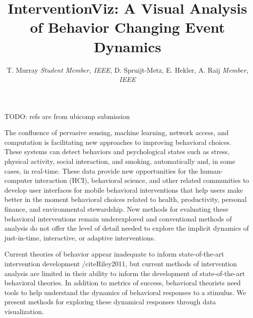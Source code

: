 \documentclass[review,journal]{vgtc}         %
\title{InterventionViz: A Visual Analysis of Behavior Changing Event Dynamics}
\author{T. Murray \textit{Student Member, IEEE}, D. Spruijt-Metz, E. Hekler, A. Raij \textit{Member, IEEE}}
\begin{document}


\maketitle


TODO: refs are from ubicomp submission

The confluence of pervasive sensing, machine learning, network access, and computation is facilitating new approaches to improving behavioral choices.
These systems can detect behaviors and psychological states such as stress\cite{chang2011,lu2012}, physical activity\cite{li2010,emken2012}, social interaction\cite{wyatt2011}, and smoking\cite{sazonov2011}, automatically and, in some cases, in real-time.
These data provide new opportunities for the human-computer interaction (HCI), behavioral science, and other related communities to develop user interfaces for mobile behavioral interventions that help users make better in the moment behavioral choices related to health\cite{klasnja2012,nahum2012}, productivity\cite{ho2005,sohn2005,jewell2011}, personal finance\cite{gallego2012}, and environmental stewardship.\cite{elliott2012}
New methods for evaluating these behavioral interventions remain underexplored and conventional methods of analysis do not offer the level of detail needed to explore the implicit dynamics of just-in-time, interactive, or adaptive interventions.

Current theories of behavior appear inadequate to inform state-of-the-art intervention development /cite{Riley2011}, but current methods of intervention analysis are limited in their ability to inform the development of state-of-the-art behavioral theories.
In addition to metrics of success, behavioral theorists need tools to help understand the dynamics of behavioral responses to a stimulus.
We present methods for exploring these dynamical responses through data visualization.
\end{document}
